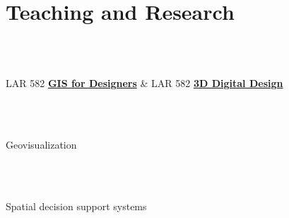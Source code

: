 \documentclass[]{baharmon_cv}
\begin{document}
{{{{{\section{Teaching and Research}
\begin{minipage}[t]{0.80\textwidth} 
\\
\end{minipage}
\begin{minipage}[t]{0.20\textwidth} 
\end{minipage}\\

LAR 582 \textbf{\href{http://www4.ncsu.edu/~baharmon/gisfordesigners/index.html}{GIS for Designers}}
\&
LAR 582 \textbf{\href{http://www4.ncsu.edu/~baharmon/teaching.html}{3D Digital Design}}
\\

\begin{minipage}[t]{0.80\textwidth} 
\\
\end{minipage}
\begin{minipage}[t]{0.20\textwidth} 
\end{minipage}\\

Geovisualization
\\

\begin{minipage}[t]{0.80\textwidth} 
\\
\end{minipage}
\begin{minipage}[t]{0.20\textwidth} 
\end{minipage}\\

Spatial decision support systems
\\

\begin{minipage}[t]{0.80\textwidth} 
\\
\end{minipage}
\begin{minipage}[t]{0.20\textwidth} 
\end{minipage}\\

}}}}}
\end{document}
